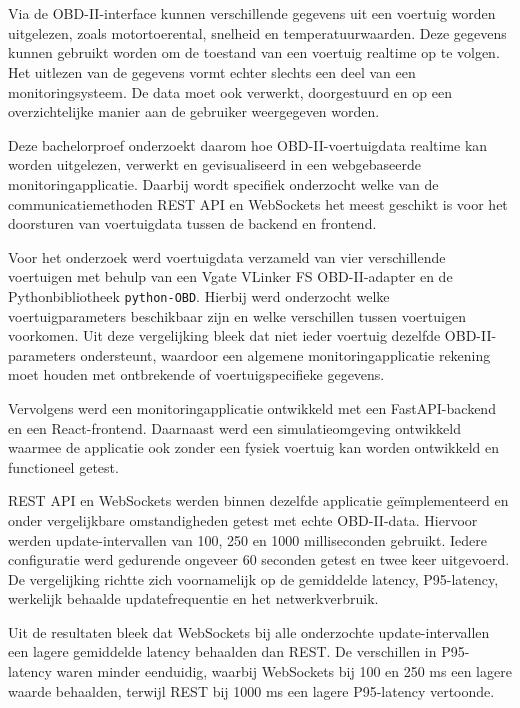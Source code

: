 \chapter{}%
\label{ch:samenvatting}

Via de OBD-II-interface kunnen verschillende gegevens uit een voertuig worden
uitgelezen, zoals motortoerental, snelheid en temperatuurwaarden. Deze gegevens
kunnen gebruikt worden om de toestand van een voertuig realtime op te volgen.
Het uitlezen van de gegevens vormt echter slechts een deel van een
monitoringsysteem. De data moet ook verwerkt, doorgestuurd en op een
overzichtelijke manier aan de gebruiker weergegeven worden.

Deze bachelorproef onderzoekt daarom hoe OBD-II-voertuigdata realtime kan worden
uitgelezen, verwerkt en gevisualiseerd in een webgebaseerde
monitoringapplicatie. Daarbij wordt specifiek onderzocht welke van de
communicatiemethoden REST API en WebSockets het meest geschikt is voor het
doorsturen van voertuigdata tussen de backend en frontend.

Voor het onderzoek werd voertuigdata verzameld van vier verschillende
voertuigen met behulp van een Vgate VLinker FS OBD-II-adapter en de
Pythonbibliotheek \texttt{python-OBD}. Hierbij werd onderzocht welke
voertuigparameters beschikbaar zijn en welke verschillen tussen voertuigen
voorkomen. Uit deze vergelijking bleek dat niet ieder voertuig dezelfde
OBD-II-parameters ondersteunt, waardoor een algemene monitoringapplicatie
rekening moet houden met ontbrekende of voertuigspecifieke gegevens.

Vervolgens werd een monitoringapplicatie ontwikkeld met een FastAPI-backend en
een React-frontend. Daarnaast werd een simulatieomgeving ontwikkeld waarmee de
applicatie ook zonder een fysiek voertuig kan worden ontwikkeld en functioneel
getest.

REST API en WebSockets werden binnen dezelfde applicatie geïmplementeerd en
onder vergelijkbare omstandigheden getest met echte OBD-II-data. Hiervoor
werden update-intervallen van 100, 250 en 1000 milliseconden gebruikt. Iedere
configuratie werd gedurende ongeveer 60 seconden getest en twee keer
uitgevoerd. De vergelijking richtte zich voornamelijk op de gemiddelde
latency, P95-latency, werkelijk behaalde updatefrequentie en het
netwerkverbruik.

Uit de resultaten bleek dat WebSockets bij alle onderzochte update-intervallen
een lagere gemiddelde latency behaalden dan REST. De verschillen in
P95-latency waren minder eenduidig, waarbij WebSockets bij 100 en 250 ms een
lagere waarde behaalden, terwijl REST bij 1000 ms een lagere P95-latency
vertoonde.

